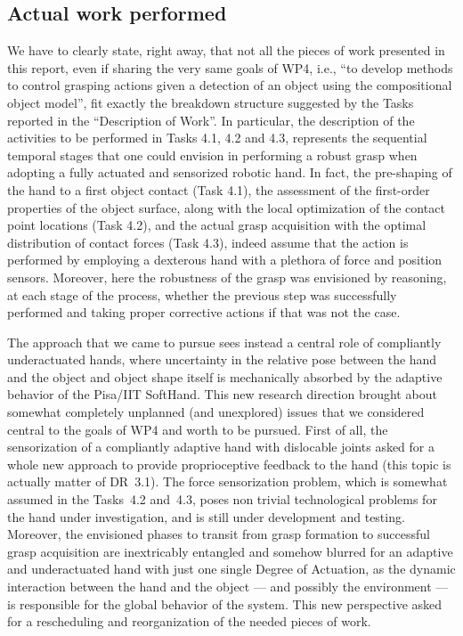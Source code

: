 \documentclass[a4paper,11pt,pdf]{pacmanreport}
\begin{document}
\subsection{Actual work performed}

We have to clearly state, right away, that not all the pieces of work presented in this report, even if sharing the very same goals of WP4, i.e., ``to develop methods to control grasping actions given a detection of an object using the compositional object model'', fit exactly the breakdown structure suggested by the Tasks reported in the ``Description of Work''. In particular, the description of the activities to be performed in Tasks 4.1, 4.2 and 4.3, represents the sequential temporal stages that one could envision in performing a robust grasp when adopting a fully actuated and sensorized robotic hand. In fact, the pre-shaping of the hand to a first object contact (Task 4.1), the assessment of the first-order properties of the object surface, along with the local optimization of the contact point locations (Task 4.2), and the actual grasp acquisition with the optimal distribution of contact forces (Task 4.3), indeed assume that the action is performed by employing a dexterous hand with a plethora of force and position sensors. Moreover, here the robustness of the grasp was envisioned by reasoning, at each stage of the process, whether the previous step was successfully performed and taking proper corrective actions if that was not the case.

The approach that we came to pursue sees instead a central role of compliantly underactuated hands, where uncertainty in the relative pose between the hand and the object and object shape itself is mechanically absorbed by the adaptive behavior of the Pisa/IIT SoftHand. This new research direction brought about somewhat completely unplanned (and unexplored) issues that we considered central to the goals of WP4 and worth to be pursued. First of all, the sensorization of a compliantly adaptive hand with dislocable joints asked for a whole new approach to provide proprioceptive feedback to the hand (this topic is actually matter of DR~3.1). The force sensorization problem, which is somewhat assumed in the Tasks~4.2 and~4.3, poses non trivial technological problems for the hand under investigation, and is still under development and testing. Moreover, the envisioned phases to transit from grasp formation to successful grasp acquisition are inextricably entangled and somehow blurred for an adaptive and underactuated hand with just one single Degree of Actuation, as the dynamic interaction between the hand and the object --- and possibly the environment --- is responsible for the global behavior of the system. This new perspective asked for a rescheduling and reorganization of the needed pieces of work.
\end{document}
